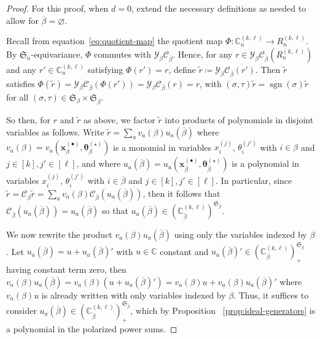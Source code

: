 \documentclass[11pt, reqno]{amsart}
\theoremstyle{definition}
\theoremstyle{remark}
\numberwithin{equation}{section}
\newcommand{\0}{\emptyset}
\newcommand{\C}{\mathbb{C}}
\renewcommand{\S}{\mathfrak{S}}
\newcommand{\cC}{\mathcal{C}}
\newcommand{\cY}{\mathcal{Y}}
\DeclareMathOperator{\sgn}{sgn}
\begin{document}
\begin{proof}
    For this proof, when $d=0$, extend the necessary definitions 
    as needed to allow for $\overline{\beta} = \varnothing$.

    Recall from equation~\eqref{eq:quotient-map} the quotient 
    map $\Phi: \C_n^{(k,\ell)} \to R_n^{(k,\ell)}$. 
    By $\S_n$-equivariance, $\Phi$ commutes with $\cY_\beta\cC_{\overline{\beta}}$.
    Hence, for any $r \in \cY_{\beta} \cC_{\overline{\beta}}\left(R_n^{(k,\ell)}\right)$ 
    and any $r' \in \C_n^{(k,\ell)}$ satisfying $\Phi(r') = r$, 
    define $\tilde{r} \coloneqq \cY_{\beta} \cC_{\overline{\beta}}(r')$. 
    Then $\tilde{r}$ satisfies $\Phi(\tilde{r}) = 
    \cY_{\beta} \cC_{\overline{\beta}}(\Phi(r'))= \cY_{\beta} \cC_{\overline{\beta}}(r) = r $, 
    with $(\sigma,\tau)\tilde{r} = \sgn(\sigma)\tilde{r}$ for all 
    $(\sigma,\tau) \in \S_\beta \times \S_{\overline{\beta}}$.

    So then, for $r$ and $\tilde{r}$ as above, we factor $\tilde{r}$ 
    into products of polynomials in disjoint variables as follows.
    Write $\tilde{r} = \sum_a v_a(\beta) u_a(\overline{\beta})$ where 
    $v_a(\beta) = v_a\left(\bm{x}_\beta^{(\bullet)}, \bm{\theta}_\beta^{(\star)}\right)$ 
    is a monomial in variables $x_i^{(j)}$, $\theta_i^{(j')}$ 
    with $i \in \beta$ and $j \in [k], j' \in [\ell]$, and where 
    $u_a(\overline{\beta})=u_a\left(\bm{x}_{\overline{\beta}}^{(\bullet)}, \bm{\theta}_{\overline{\beta}}^{(\star)}\right)$ is a polynomial in variables $x_i^{(j)}$, $\theta_i^{(j')}$ with $i \in {\overline{\beta}}$ and $j \in [k], j' \in [\ell]$. In particular, since $\tilde{r} = \cC_{\overline{\beta}} \tilde{r} = \sum_a v_a(\beta)\cC_{\overline{\beta}} ( u_a(\overline{\beta}))$, then it follows that $\cC_{\overline{\beta}} ( u_a(\overline{\beta}))= u_a(\overline{\beta})$ so that $u_a(\overline{\beta}) \in \left(\C_{\overline{\beta}}^{(k,\ell)}\right)^{\S_{\overline{\beta}}}$. 

    We now rewrite the product $v_a(\beta) u_a(\overline{\beta})$ 
    using only the variables indexed by $\beta$. 
    Let $u_a(\overline{\beta}) = u + u_a(\overline{\beta})'$ with 
    $u \in \C$ constant and 
    $u_a(\overline{\beta})' \in 
    \left(\C_{\overline{\beta}}^{(k,\ell)}\right)_+^{\S_{\overline{\beta}}}$ 
    having constant term zero, then 
    $v_a(\beta) u_a(\overline{\beta}) = v_a(\beta) (u + u_a(\overline{\beta})') = 
    v_a(\beta) u + v_a(\beta) u_a(\overline{\beta})'$ where $v_a(\beta) u$ is 
    already written with only variables indexed by $\beta$. 
    Thus, it suffices to consider $u_a(\overline{\beta}) \in 
    \left(\C_{\overline{\beta}}^{(k,\ell)}\right)_+^{\S_{\overline{\beta}}}$, 
    which by Proposition ~\ref{prop:ideal-generators} 
    is a polynomial in the polarized power sums.


\end{proof}
\end{document}
